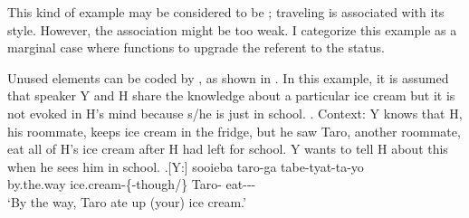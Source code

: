 This kind of example may be considered to be ;
traveling is associated with its style.
However, the association might be too weak.
I categorize this example as a marginal  case where  functions to upgrade the referent to the  status.

Unused elements can be coded by ,
as shown in \Next.
In this example,
it is assumed that speaker Y and  H share the knowledge about a particular ice cream
but it is not evoked in H's mind
because s/he is just in school.
%
\ex. \label{aisuT}Context: Y knows that H, his roommate, keeps ice cream in the fridge,
	but he saw Taro, another roommate, eat all of H's ice cream after H had left for school.
	Y wants to tell H about this when he sees him in school.
	\ag.[Y:] sooieba  taro-ga tabe-tyat-ta-yo \\
		by.the.way ice.cream-\{-though/\} Taro- eat--- \\
		`By the way, Taro ate up (your) ice cream.'


%		



